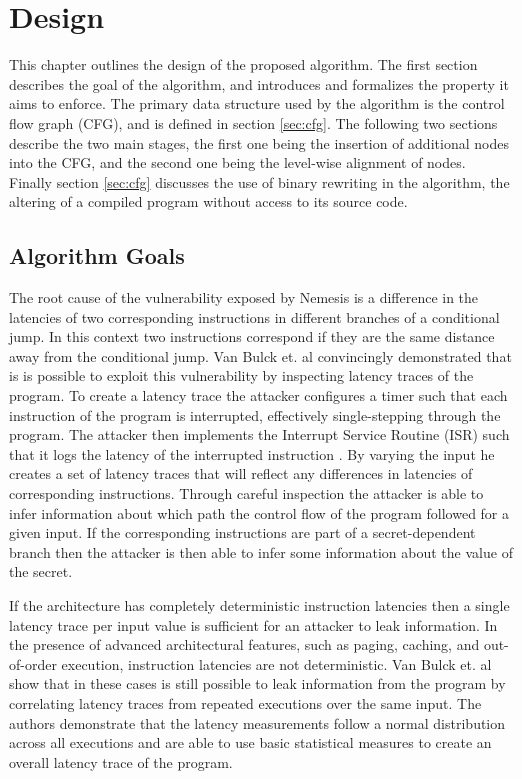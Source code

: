 \chapter{Design}
\label{cha:design}

This chapter outlines the design of the proposed algorithm.
The first section describes the goal of the algorithm, and introduces and formalizes the property it aims to enforce.
The primary data structure used by the algorithm is the control flow graph (CFG), and is defined in section \ref{sec:cfg}.
The following two sections describe the two main stages, the first one being the insertion of additional nodes into the CFG, and the second one being
the level-wise alignment of nodes. 
Finally section \ref{sec:cfg} discusses the use of binary rewriting in the algorithm, the altering of a compiled program without access to its source code. 


\section{Algorithm Goals}
\label{sec:goals}
The root cause of the vulnerability exposed by Nemesis is a difference in the latencies of two corresponding instructions in different branches of a 
conditional jump. 
In this context two instructions correspond if they are the same distance away from the conditional jump. 
Van Bulck et. al \cite{Nemesis} convincingly demonstrated that is is possible to exploit this vulnerability by inspecting latency traces of the program.
To create a latency trace the attacker configures a timer such that each instruction of the program is interrupted, effectively single-stepping through the program. 
The attacker then implements the Interrupt Service Routine (ISR) such that it logs the latency of the interrupted instruction \cite{nemesisrepo, sancussupport}.
By varying the input he creates a set of latency traces that will reflect any differences in latencies of corresponding instructions.
Through careful inspection the attacker is able to infer information about which path the control flow of the program followed for a given input. 
If the corresponding instructions are part of a secret-dependent branch then the attacker is then able to infer some information about the value of the secret. 

If the architecture has completely deterministic instruction latencies then a single latency trace per input value is sufficient for an attacker to leak information.
In the presence of advanced architectural features, such as paging, caching, and out-of-order execution, instruction latencies are not deterministic. 
Van Bulck et. al \cite{Nemesis} show that in these cases is still possible to leak information from the program by correlating latency traces from repeated executions over the same input. 
The authors demonstrate that the latency measurements follow a normal distribution across all executions and are able to use basic statistical measures to create an overall latency trace 
of the program. 
	
